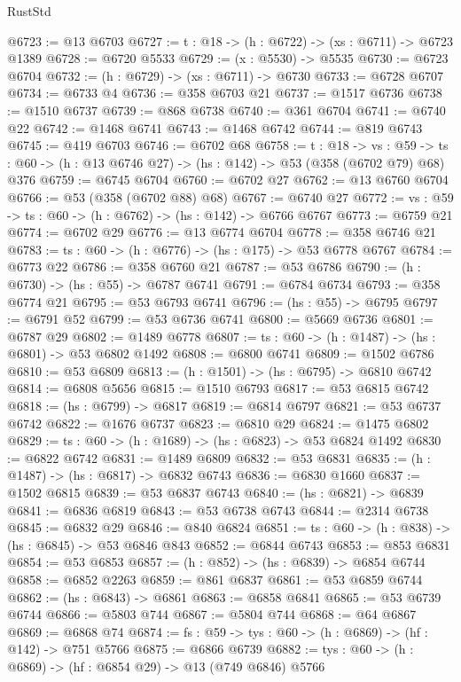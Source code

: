 \begin{lexlean}{RustStd}
\begin{coremodule}
@6723 := @13 @6703
@6727 := {t : @18} -> (h : @6722) -> (xs : @6711) -> @6723 @1389
@6728 := @6720 @5533
@6729 := (x : @5530) -> @5535
@6730 := @6723 @6704
@6732 := (h : @6729) -> (xs : @6711) -> @6730
@6733 := @6728 @6707
@6734 := @6733 @4
@6736 := @358 @6703 @21
@6737 := @1517 @6736
@6738 := @1510 @6737
@6739 := @868 @6738
@6740 := @361 @6704
@6741 := @6740 @22
@6742 := @1468 @6741
@6743 := @1468 @6742
@6744 := @819 @6743
@6745 := @419 @6703
@6746 := @6702 @68
@6758 := {t : @18} ->
  {vs : @59} -> {ts : @60} -> (h : @13 @6746 @27) -> (hs : @142) -> @53 (@358 (@6702 @79) @68) @376
@6759 := @6745 @6704
@6760 := @6702 @27
@6762 := @13 @6760 @6704
@6766 := @53 (@358 (@6702 @88) @68)
@6767 := @6740 @27
@6772 := {vs : @59} -> {ts : @60} -> (h : @6762) -> (hs : @142) -> @6766 @6767
@6773 := @6759 @21
@6774 := @6702 @29
@6776 := @13 @6774 @6704
@6778 := @358 @6746 @21
@6783 := {ts : @60} -> (h : @6776) -> (hs : @175) -> @53 @6778 @6767
@6784 := @6773 @22
@6786 := @358 @6760 @21
@6787 := @53 @6786
@6790 := (h : @6730) -> (hs : @55) -> @6787 @6741
@6791 := @6784 @6734
@6793 := @358 @6774 @21
@6795 := @53 @6793 @6741
@6796 := (hs : @55) -> @6795
@6797 := @6791 @52
@6799 := @53 @6736 @6741
@6800 := @5669 @6736
@6801 := @6787 @29
@6802 := @1489 @6778
@6807 := {ts : @60} -> (h : @1487) -> (hs : @6801) -> @53 @6802 @1492
@6808 := @6800 @6741
@6809 := @1502 @6786
@6810 := @53 @6809
@6813 := (h : @1501) -> (hs : @6795) -> @6810 @6742
@6814 := @6808 @5656
@6815 := @1510 @6793
@6817 := @53 @6815 @6742
@6818 := (hs : @6799) -> @6817
@6819 := @6814 @6797
@6821 := @53 @6737 @6742
@6822 := @1676 @6737
@6823 := @6810 @29
@6824 := @1475 @6802
@6829 := {ts : @60} -> (h : @1689) -> (hs : @6823) -> @53 @6824 @1492
@6830 := @6822 @6742
@6831 := @1489 @6809
@6832 := @53 @6831
@6835 := (h : @1487) -> (hs : @6817) -> @6832 @6743
@6836 := @6830 @1660
@6837 := @1502 @6815
@6839 := @53 @6837 @6743
@6840 := (hs : @6821) -> @6839
@6841 := @6836 @6819
@6843 := @53 @6738 @6743
@6844 := @2314 @6738
@6845 := @6832 @29
@6846 := @840 @6824
@6851 := {ts : @60} -> (h : @838) -> (hs : @6845) -> @53 @6846 @843
@6852 := @6844 @6743
@6853 := @853 @6831
@6854 := @53 @6853
@6857 := (h : @852) -> (hs : @6839) -> @6854 @6744
@6858 := @6852 @2263
@6859 := @861 @6837
@6861 := @53 @6859 @6744
@6862 := (hs : @6843) -> @6861
@6863 := @6858 @6841
@6865 := @53 @6739 @6744
@6866 := @5803 @744
@6867 := @5804 @744
@6868 := @64 @6867
@6869 := @6868 @74
@6874 := {fs : @59} -> {tys : @60} -> (h : @6869) -> (hf : @142) -> @751 @5766
@6875 := @6866 @6739
@6882 := {tys : @60} -> (h : @6869) -> (hf : @6854 @29) -> @13 (@749 @6846) @5766

\end{coremodule}
\end{lexlean}
